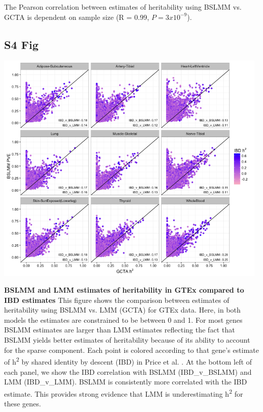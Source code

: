 \documentclass[10pt,letterpaper]{article}
\begin{document}
\begin{singlespace}
 The Pearson correlation between estimates of heritability using BSLMM vs. GCTA is dependent on sample size (R = 0.99, $P = 3 x 10^{-9}$).

\subsection*{S4 Fig}
\includegraphics[width=13cm]{Figures/Fig-GTEx_TW_colorPriceh2bloodcis_pve_v_h2.png}
\label{S4_Fig}

{\bf BSLMM and LMM estimates of heritability in GTEx compared to IBD estimates} 
This figure shows the comparison between estimates of heritability using BSLMM vs. LMM (GCTA) for GTEx data. Here, in both models the estimates are constrained to be between 0 and 1. For most genes BSLMM estimates are larger than LMM estimates reflecting the fact that BSLMM yields better estimates of heritability because of its ability to account for the sparse component. Each point is colored according to that gene's estimate of h\textsuperscript{2} by shared identity by descent (IBD) in Price et al. \cite{Price_2011}. At the bottom left of each panel, we show the IBD correlation with BSLMM (IBD\_v\_BSLMM) and LMM (IBD\_v\_LMM). BSLMM is consistently more correlated with the IBD estimate. This  provides strong evidence that LMM is underestimating h\textsuperscript{2} for these genes.


\end{singlespace}
\end{document}
